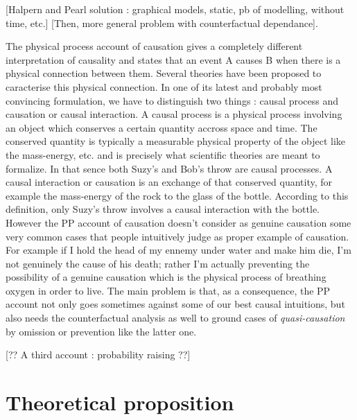 \documentclass[10pt,letterpaper]{article}
\begin{document}
[Halpern and Pearl solution : graphical models, static, pb of modelling, without time, etc.] 
[Then, more general problem with counterfactual dependance].

The physical process account of causation gives a completely different interpretation of causality and states that an event A causes B when there is a physical connection between them. Several theories have been proposed to caracterise this physical connection. In one of its latest and probably most convincing formulation, we have to distinguish two things : causal process and causation or causal interaction. A causal process is a physical process involving an object which conserves a certain quantity accross space and time. The conserved quantity is typically a measurable physical property of the object like the mass-energy, etc. and is precisely what scientific theories are meant to formalize. In that sence both Suzy's and Bob's throw are causal processes. A causal interaction or causation is an exchange of that conserved quantity, for example the mass-energy of the rock to the glass of the bottle. According to this definition, only Suzy's throw involves a causal interaction with the bottle. However the PP account of causation doesn't consider as genuine causation some very common cases that people intuitively judge as proper example of causation. For example if I hold the head of my ennemy under water and make him die, I'm not genuinely the cause of his death; rather I'm actually preventing the possibility of a genuine causation which is the physical process of breathing oxygen in order to live. The main problem is that, as a consequence, the PP account not only goes sometimes against some of our best causal intuitions, but also needs the counterfactual analysis as well to ground cases of \textit{quasi-causation} by omission or prevention like the latter one.


[?? A third account : probability raising ??]


\section{Theoretical proposition}
\end{document}
